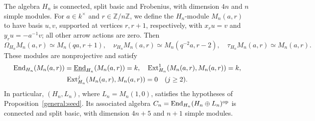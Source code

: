 \documentclass[11pt]{article}
\begin{document}
\begin{Prop}\label{family:seed}
The algebra $H_n$ is connected, split basic and Frobenius, with
dimension $4n$ and $n$ simple modules.  For $a\in k^\times$ and
$r\in\mathbb Z/n\mathbb Z$, we define the $H_n$-module $M_n(a,r)$ to have basis
$u,v$, supported at vertices $r,r+1$, respectively, with
$x_ru=v$ and $y_ru=-a^{-1}v$; all other arrow actions are zero.
Then
\begin{equation*}
 \Omega_{H_n}M_n(a,r)\simeq M_n(qa,r+1),\quad
 \nu_{H_n}M_n(a,r)\simeq M_n(q^{-2}a,r-2),\quad
 \tau_{H_n}M_n(a,r)\simeq M_n(a,r).
\end{equation*}
These modules are nonprojective and satisfy
\begin{equation*}
 \begin{gathered}
 {\rm End}_{H_n}(M_n(a,r))=\underline{{\rm End}}_{H_n}(M_n(a,r))=k,\quad
 {\rm Ext}_{H_n}^1(M_n(a,r),M_n(a,r))=k,\\
 {\rm Ext}_{H_n}^j(M_n(a,r),M_n(a,r))=0\quad(j\ge2).
 \end{gathered}
\end{equation*}
In particular, $(H_n,L_n)$, where $L_n=M_n(1,0)$, satisfies the
hypotheses of Proposition~\ref{general:seed}.  Its associated algebra
$C_n={\rm End}_{H_n}(H_n\oplus L_n)^{\mathrm{op}}$ is connected and
split basic, with dimension $4n+5$ and $n+1$ simple modules.
\end{Prop}
\end{document}
